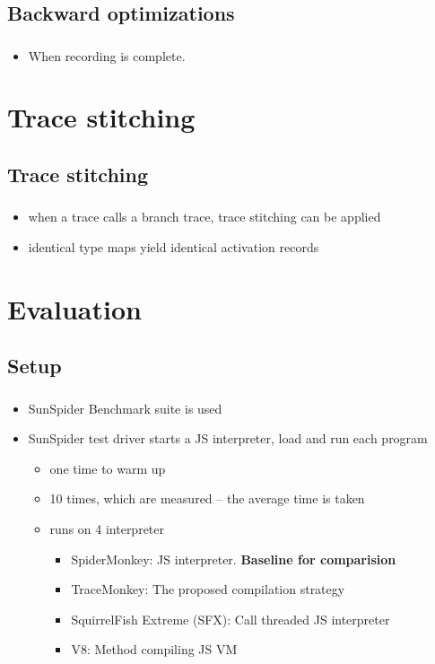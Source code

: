 \documentclass[mathserif,10pt]{beamer}
\begin{document}
\subsection{Backward optimizations}
\frame
{
  \frametitle{\subsecname}
  \begin{itemize}
    \item When recording is complete.
  \end{itemize}    
}
\section{Trace stitching}
\subsection{Trace stitching}
\frame
{
  \frametitle{\subsecname}
  \begin{itemize}
    \item when a trace calls a branch trace, trace stitching can be applied
    \item identical type maps yield identical activation records
  \end{itemize}
}

\section{Evaluation}
\subsection{Setup}
\frame
{
  \frametitle{\subsecname}
  \begin{itemize}
    \item SunSpider Benchmark suite is used
    \item SunSpider test driver starts a JS interpreter, load and run each program
    \begin{itemize}
      \item one time to warm up
      \item 10 times, which are measured – the average time is taken
      \item runs on 4 interpreter
      \begin{itemize}
        \item SpiderMonkey: JS interpreter. \textbf{Baseline for comparision}
        \item TraceMonkey: The proposed compilation strategy
        \item SquirrelFish Extreme (SFX): Call threaded JS interpreter
        \item V8: Method compiling JS VM
      \end{itemize}
    \end{itemize}
  \end{itemize}
}
\end{document}

